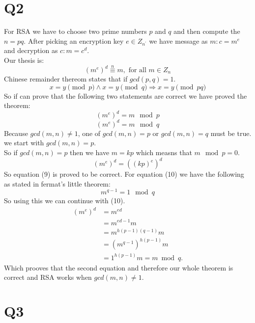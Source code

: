 \documentclass[a4paper, 11pt]{article}
\begin{document}
\section{Q2}
For RSA we have to choose two prime numbers $p$ and $q$
and then compute the $n = pq$. After picking an encryption key $e \in
Z_{n^\prime}$ we have message as $m: c = m^e$ and decryption as $c: m = c^d$.
\\
Our thesis is:
\begin{equation}
    (m^e)^d \stackrel{n}{\equiv} m, \text{ for all } m \in Z_{n}
\end{equation}
Chinese remainder thereom states that if $gcd(p,q)=1$.
\begin{equation}
    x = y \pmod p \land x = y \pmod q \Rightarrow x = y \pmod{pq}
\end{equation}
So if can prove that the following two statements are correct we have proved
the theorem:
\begin{equation}
    (m^e)^d = m \mod p
\end{equation}
\begin{equation}
    (m^e)^d = m \mod q
\end{equation}
Because $gcd(m,n) \neq 1$, one of $gcd(m,n) = p$ or $gcd(m,n) = q$ must be
true. we start with $gcd(m,n) = p$. \\
So if $gcd(m,n) = p$ then we have $m = kp$ which measns that $m \mod p = 0$.
\begin{equation}
    (m^e)^d = ((kp)^e)^d
\end{equation}
So equation (9) is proved to be correct.
For equation (10) we have the following as stated in fermat's little theorem:
\begin{equation}
    m^{q-1} = 1 \mod q
\end{equation}
So using this we can continue with (10).
\begin{equation}
    \begin{aligned}
        (m^{e})^d &= m^{ed} \\
                  &= m^{ed - 1}m\\
                  &= m^{h(p-1)(q-1)}m\\
                  &= (m^{q-1})^{h(p-1)}m\\
                  &= 1^{h(p-1)}m = m \bmod{q}.
    \end{aligned}
\end{equation}
Which prooves that the second equation and therefore our whole theorem is
correct and RSA works when $gcd(m,n) \neq 1$.
\section{Q3}
\end{document}
